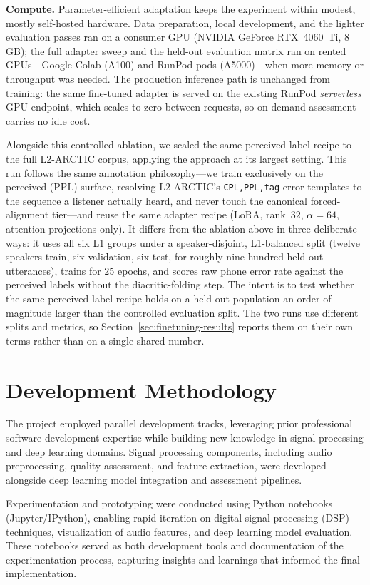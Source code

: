 \documentclass[a4paper,12pt]{report}
\begin{document}
\textbf{Compute.} Parameter-efficient adaptation keeps the experiment within modest, mostly self-hosted hardware. Data preparation, local development, and the lighter evaluation passes ran on a consumer GPU (NVIDIA GeForce RTX~4060~Ti, 8\,GB); the full adapter sweep and the held-out evaluation matrix ran on rented GPUs---Google Colab (A100) and RunPod pods (A5000)---when more memory or throughput was needed. The production inference path is unchanged from training: the same fine-tuned adapter is served on the existing RunPod \emph{serverless} GPU endpoint, which scales to zero between requests, so on-demand assessment carries no idle cost.

Alongside this controlled ablation, we scaled the same perceived-label recipe to the full L2-ARCTIC corpus, applying the approach at its largest setting. This run follows the same annotation philosophy---we train exclusively on the perceived (PPL) surface, resolving L2-ARCTIC's \texttt{CPL,PPL,tag} error templates to the sequence a listener actually heard, and never touch the canonical forced-alignment tier---and reuse the same adapter recipe (LoRA, rank~$32$, $\alpha{=}64$, attention projections only). It differs from the ablation above in three deliberate ways: it uses all six L1 groups under a speaker-disjoint, L1-balanced split (twelve speakers train, six validation, six test, for roughly nine hundred held-out utterances), trains for $25$ epochs, and scores raw phone error rate against the perceived labels without the diacritic-folding step. The intent is to test whether the same perceived-label recipe holds on a held-out population an order of magnitude larger than the controlled evaluation split. The two runs use different splits and metrics, so Section~\ref{sec:finetuning-results} reports them on their own terms rather than on a single shared number.

\section{Development Methodology}

The project employed parallel development tracks, leveraging prior professional software development expertise while building new knowledge in signal processing and deep learning domains. Signal processing components, including audio preprocessing, quality assessment, and feature extraction, were developed alongside deep learning model integration and assessment pipelines.

Experimentation and prototyping were conducted using Python notebooks (Jupyter/IPython), enabling rapid iteration on digital signal processing (DSP) techniques, visualization of audio features, and deep learning model evaluation. These notebooks served as both development tools and documentation of the experimentation process, capturing insights and learnings that informed the final implementation.
\end{document}
